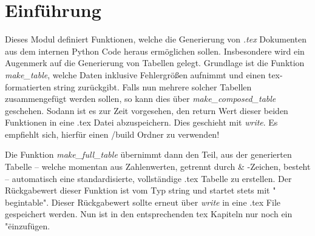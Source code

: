 \section{Einführung}
Dieses Modul definiert Funktionen, welche die Generierung von \emph{.tex} Dokumenten aus dem internen Python Code heraus ermöglichen sollen. Insbesondere wird ein Augenmerk auf die Generierung von Tabellen gelegt. Grundlage ist die Funktion \emph{make\_table}, welche Daten inklusive Fehlergrößen aufnimmt und einen tex-formatierten string zurückgibt. Falls nun mehrere solcher Tabellen zusammengefügt werden sollen, so kann dies über \emph{make\_composed\_table} geschehen. Sodann ist es zur Zeit vorgesehen, den return Wert dieser beiden Funktionen in eine .tex Datei abzuspeichern. Dies geschieht mit \emph{write}. Es empfiehlt sich, hierfür einen /build Ordner zu verwenden!

Die Funktion \emph{make\_full\_table} übernimmt dann den Teil, aus der generierten Tabelle -- welche momentan aus Zahlenwerten, getrennt durch \& -Zeichen, besteht -- automatisch eine standardisierte, vollständige .tex Tabelle zu erstellen. Der Rückgabewert dieser Funktion ist vom Typ string und startet stets mit "\\begin{table}". Dieser Rückgabewert sollte erneut über \emph{write} in eine .tex File gespeichert werden. Nun ist in den entsprechenden tex Kapiteln nur noch ein "\" einzufügen.
